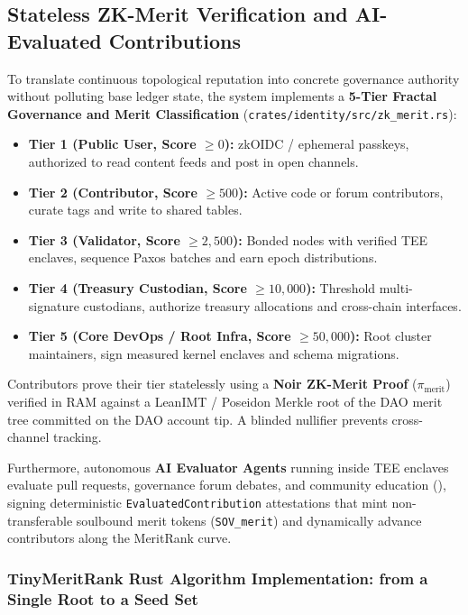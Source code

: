 \documentclass[a4paper,11pt,twoside,parskip=half-,headings=small]{scrartcl}
\newcommand{\code}[1]{\texttt{#1}}
\begin{document}
\subsection{Stateless ZK-Merit Verification and AI-Evaluated Contributions}
\label{sec:zk_merit_engine}

To translate continuous topological reputation into concrete governance authority without polluting base ledger state, the system implements a \textbf{5-Tier Fractal Governance and Merit Classification} (\code{crates/identity/src/zk\_merit.rs}):
\begin{itemize}
  \item \textbf{Tier 1 (Public User, Score $\ge 0$):} zkOIDC / ephemeral passkeys, authorized to read content feeds and post in open channels.
  \item \textbf{Tier 2 (Contributor, Score $\ge 500$):} Active code or forum contributors, curate tags and write to shared tables.
  \item \textbf{Tier 3 (Validator, Score $\ge 2{,}500$):} Bonded nodes with verified TEE enclaves, sequence Paxos batches and earn epoch distributions.
  \item \textbf{Tier 4 (Treasury Custodian, Score $\ge 10{,}000$):} Threshold multi-signature custodians, authorize treasury allocations and cross-chain interfaces.
  \item \textbf{Tier 5 (Core DevOps / Root Infra, Score $\ge 50{,}000$):} Root cluster maintainers, sign measured kernel enclaves and schema migrations.
\end{itemize}
Contributors prove their tier statelessly using a \textbf{Noir ZK-Merit Proof} ($\pi_{\text{merit}}$) verified in RAM against a LeanIMT / Poseidon Merkle root of the DAO merit tree committed on the DAO account tip. A blinded nullifier prevents cross-channel tracking.

Furthermore, autonomous \textbf{AI Evaluator Agents} running inside TEE enclaves evaluate pull requests, governance forum debates, and community education (), signing deterministic \code{EvaluatedContribution} attestations that mint non-transferable soulbound merit tokens (\code{SOV\_merit}) and dynamically advance contributors along the MeritRank curve.

\subsubsection{TinyMeritRank Rust Algorithm Implementation: from a Single Root to a Seed Set}
\label{sec:multiseed}
\end{document}
